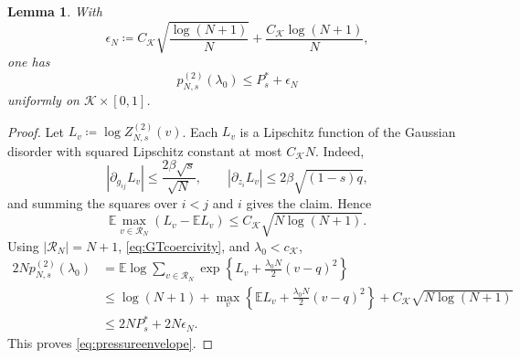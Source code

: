 \documentclass[11pt]{article}
\newtheorem{lemma}[theorem]{Lemma}
\numberwithin{equation}{section}
\newcommand{\E}{\mathbb{E}}
\newcommand{\1}{\mathbf 1}
\newcommand{\cK}{\mathcal K}
\begin{document}
\begin{lemma}
\label{lem:sublinearpressure}
With
\[
 \epsilon_N\coloneqq C_{\cK}
 \sqrt{\frac{\log(N+1)}N}+\frac{C_{\cK}\log(N+1)}N,
\]
one has
\begin{equation}
 p^{(2)}_{N,s}(\lambda_0)\le P_s^*+\epsilon_N
 \label{eq:pressureenvelope}
\end{equation}
uniformly on $\cK\times[0,1]$.
\end{lemma}

\begin{proof}
Let $L_v\coloneqq\log Z^{(2)}_{N,s}(v)$.  Each $L_v$ is a Lipschitz function
of the Gaussian disorder with squared Lipschitz constant at most
$C_{\cK}N$.  Indeed,
\[
 \left|\partial_{g_{ij}}L_v\right|
 \le\frac{2\beta\sqrt s}{\sqrt N},\qquad
 \left|\partial_{z_i}L_v\right|
 \le2\beta\sqrt{(1-s)q},
\]
and summing the squares over $i<j$ and $i$ gives the claim.  Hence
\begin{equation}
 \E\max_{v\in\mathcal R_N}(L_v-\E L_v)
 \le C_{\cK}\sqrt{N\log(N+1)}.
 \label{eq:gaussianmax}
\end{equation}
Using $|\mathcal R_N|=N+1$, \eqref{eq:GTcoercivity}, and
$\lambda_0<c_{\cK}$,
\begin{align*}
 2Np^{(2)}_{N,s}(\lambda_0)
 &=
 \E\log\sum_{v\in\mathcal R_N}
 \exp\left\{L_v+\frac{\lambda_0N}{2}(v-q)^2\right\}\\
 &\le
 \log(N+1)+
 \max_v\left\{\E L_v+\frac{\lambda_0N}{2}(v-q)^2\right\}
 +C_{\cK}\sqrt{N\log(N+1)}\\
 &\le2NP_s^*+2N\epsilon_N.
\end{align*}
This proves \eqref{eq:pressureenvelope}.
\end{proof}
\end{document}
